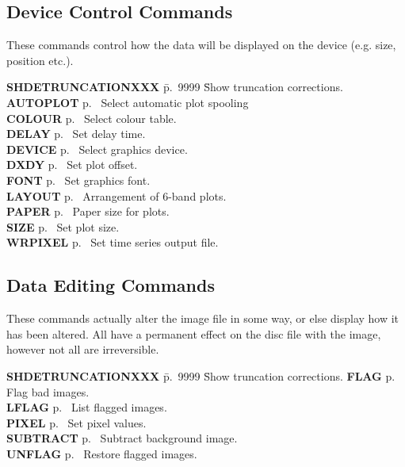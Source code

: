 \subsection{Device Control Commands}

These commands control how the data will be displayed on the device
(e.g. size, position etc.).

\begin{tabbing}
{\bf SHDETRUNCATIONXXX} \= p.~9999 \= Show truncation corrections.\kill
{\bf AUTOPLOT} \> p.~\pageref{au} \> Select automatic plot spooling\\ 
{\bf COLOUR} \> p.~\pageref{col} \> Select colour table.\\ 
{\bf DELAY} \> p.~\pageref{del} \> Set delay time.\\ 
{\bf DEVICE} \> p.~\pageref{dev} \> Select graphics device.\\ 
{\bf DXDY} \> p.~\pageref{dx} \> Set plot offset.\\ 
{\bf FONT} \> p.~\pageref{fo} \> Set graphics font.\\ 
{\bf LAYOUT} \> p.~\pageref{la} \> Arrangement of 6-band plots.\\ 
{\bf PAPER} \> p.~\pageref{pa} \> Paper size for plots.\\ 
{\bf SIZE} \> p.~\pageref{siz} \> Set plot size.\\ 
{\bf WRPIXEL} \> p.~\pageref{wr} \> Set time series output file.\\
\end{tabbing}

\subsection{Data Editing Commands}

These commands actually alter the image file in some way, or else
display how it has been altered. All have a permanent effect on the
disc file with the image, however not all are irreversible.

\begin{tabbing}
{\bf SHDETRUNCATIONXXX} \= p.~9999 \= Show truncation corrections.\kill
{\bf FLAG} \> p.~\pageref{fl} \> Flag bad images.\\ 
{\bf LFLAG} \> p.~\pageref{lf} \> List flagged images.\\ 
{\bf PIXEL} \> p.~\pageref{pi} \> Set pixel values.\\ 
{\bf SUBTRACT} \> p.~\pageref{sub} \> Subtract background image.\\ 
{\bf UNFLAG} \> p.~\pageref{un} \> Restore flagged images.\\
\end{tabbing}

